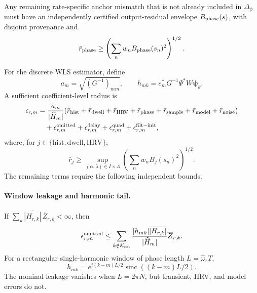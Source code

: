 \documentclass[11pt]{article}
\theoremstyle{definition}
\theoremstyle{remark}
\newcommand{\Kset}{\mathcal K_{\rm est}}
\begin{document}
Any remaining rate-specific anchor mismatch that is not already included in
\(\Delta_\phi\) must have an independently certified output-residual envelope
\(B_{\rm phase}(s)\), with disjoint provenance and
\[
 \bar r_{\rm phase}\ge
 \left(\sum_n w_n B_{\rm phase}(s_n)^2\right)^{1/2}.
\]

For the discrete WLS estimator, define
\[
 a_m=\sqrt{(G^{-1})_{mm}},\qquad
 h_{mk}=e_m^*G^{-1}\Psi^*W\boldsymbol\psi_k.
\]
A sufficient coefficient-level radius is
\begin{align}
 \epsilon_{r,m}
 &=\frac{a_m}{|\widehat H_m|}
   (\bar r_{\rm hist}+\bar r_{\rm dwell}+\bar r_{\rm HRV}
   +\bar r_{\rm phase}+\bar r_{\rm sample}
   +\bar r_{\rm model}+\bar r_{\rm noise})
   \notag\\
 &\quad+\epsilon^{\rm omitted}_{r,m}
   +\epsilon^{\rm delay}_{r,m}
   +\epsilon^{\rm quad}_{r,m}
   +\epsilon^{\rm filt-init}_{r,m},
 \label{eq:total-radius}
\end{align}
where, for \(j\in\{\mathrm{hist},\mathrm{dwell},\mathrm{HRV}\}\),
\begin{equation}
 \bar r_j\ge
 \sup_{(\alpha,\lambda)\in I\times\Lambda}
 \left(\sum_n w_n B_j(s_n)^2\right)^{1/2}.
 \label{eq:dynamic-budget}
\end{equation}
The remaining terms require the following independent bounds.

\paragraph{Window leakage and harmonic tail.}
If \(\sum_k\overline{|H_{r,k}|}\,\overline Z_{r,k}<\infty\), then
\[
 \epsilon^{\rm omitted}_{r,m}\le
 \sum_{k\notin\Kset}
 \frac{|h_{mk}|\overline{|H_{r,k}|}}{|\widehat H_m|}
 \overline Z_{r,k}.
\]
For a rectangular single-harmonic window of phase length
\(L=\widehat\omega_rT\),
\[
 h_{mk}=e^{i(k-m)L/2}
 \operatorname{sinc}((k-m)L/2).
\]
The nominal leakage vanishes when \(L=2\pi N\), but transient, HRV, and model
errors do not.
\end{document}
